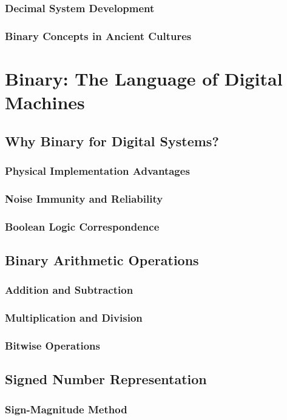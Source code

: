 \documentclass[12pt, oneside]{book}
\begin{document}
\subsubsection{Decimal System Development}
\subsubsection{Binary Concepts in Ancient Cultures}

\section{Binary: The Language of Digital Machines}
\subsection{Why Binary for Digital Systems?}
\subsubsection{Physical Implementation Advantages}
\subsubsection{Noise Immunity and Reliability}
\subsubsection{Boolean Logic Correspondence}

\subsection{Binary Arithmetic Operations}
\subsubsection{Addition and Subtraction}
\subsubsection{Multiplication and Division}
\subsubsection{Bitwise Operations}

\subsection{Signed Number Representation}
\subsubsection{Sign-Magnitude Method}
\end{document}
